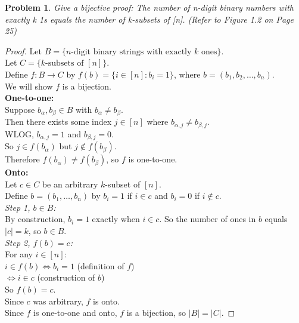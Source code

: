 \documentclass{article}
\theoremstyle{plain}
\newtheorem{problem}{Problem}
\begin{document}
\setcounter{problem}{5}
\begin{problem}
    Give a bijective proof: The number of n-digit binary numbers with exactly k 1s equals the number of k-subsets of [n]. (Refer to Figure 1.2 on Page 25)
\end{problem}

\begin{proof}
Let $B = \{n\text{-digit binary strings with exactly } k \text{ ones}\}$.\\
Let $C = \{k\text{-subsets of } [n]\}$.\\
Define $f: B \rightarrow C$ by $f(b) = \{i \in [n] : b_i = 1\}$, 
where $b = (b_1, b_2, \dots, b_n)$.\\
We will show $f$ is a bijection.\\

\textbf{One-to-one:}\\
Suppose $b_\alpha, b_\beta \in B$ with $b_\alpha \neq b_\beta$.\\
Then there exists some index $j \in [n]$ where $b_{\alpha,j} \neq b_{\beta,j}$.\\
WLOG, $b_{\alpha,j} = 1$ and $b_{\beta,j} = 0$.\\
So $j \in f(b_\alpha)$ but $j \notin f(b_\beta)$.\\
Therefore $f(b_\alpha) \neq f(b_\beta)$, so $f$ is one-to-one.\\

\textbf{Onto:}\\
Let $c \in C$ be an arbitrary $k$-subset of $[n]$.\\
Define $b = (b_1, \dots, b_n)$ by $b_i = 1$ if $i \in c$ and $b_i = 0$ if $i \notin c$.\\
\textit{Step 1, $b \in B$:}\\
By construction, $b_i = 1$ exactly when $i \in c$. So the number of ones in $b$ equals $|c| = k$, so $b \in B$.\\
\textit{Step 2, $f(b) = c$:}\\
For any $i \in [n]$:\\
$i \in f(b) \iff b_i = 1$ \quad (definition of $f$)\\
$\iff i \in c$ \quad (construction of $b$)\\
So $f(b) = c$.\\
Since $c$ was arbitrary, $f$ is onto.\\

Since $f$ is one-to-one and onto, $f$ is a bijection, so $|B| = |C|$.
\end{proof}
\end{document}
